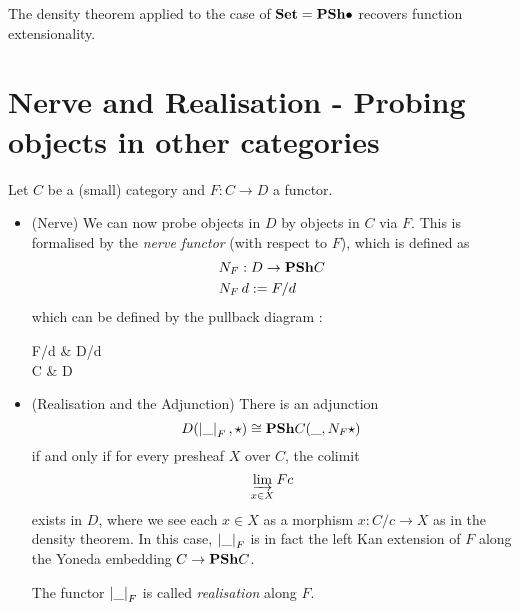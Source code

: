 \documentclass{article}
\begin{document}
\begin{eg}
  
  The density theorem applied to the case of $\mathbf{Set} = \mathbf{PSh} \bullet$
  recovers function extensionality.
\end{eg}

\section{Nerve and Realisation - Probing objects in other categories}

\begin{prop}

  Let $C$ be a (small) category and
  $F :  C \to D$ a functor.
  \begin{itemize}
    \item (Nerve)
    We can now probe objects in $D$ by objects in $C$ via $F$.
    This is formalised by the \emph{nerve functor} (with respect to $F$),
    which is defined as 
    \begin{align*}
      &N_F : D \to \mathbf{PSh} C \\
      & N_F \, d := F / d
    \end{align*}
    which can be defined by the pullback diagram : 
    \begin{cd}
      {F/d} & {D/d} \\
      C & D
      \arrow[from=1-1, to=2-1]
      \arrow[from=2-1, to=2-2]
      \arrow[from=1-2, to=2-2]
      \arrow[from=1-1, to=1-2]
      \arrow["\lrcorner"{anchor=center, pos=0.125}, draw=none, from=1-1, to=2-2]
    \end{cd}
    \item (Realisation and the Adjunction)
    There is an adjunction
    \[
      D ( \left\vert \_ \right\vert_F , \star) \cong \mathbf{PSh} C ( \_ , N_F \star)
    \]
    if and only if for every presheaf $X$ over $C$,
    the colimit \[
      \varinjlim_{x \in X} F c  
    \]
    exists in $D$, where we see each $x \in X$ as a morphism $x : C / c \to X$
    as in the density theorem.
    In this case,
    $\left\vert \_ \right\vert_F$ is in fact the left Kan extension of $F$
    along the Yoneda embedding $C \to \mathbf{PSh} C$.

    The functor $\left\vert \_ \right\vert_F$ is called \emph{realisation} along $F$.

  \end{itemize}

 

\end{prop}
\end{document}
